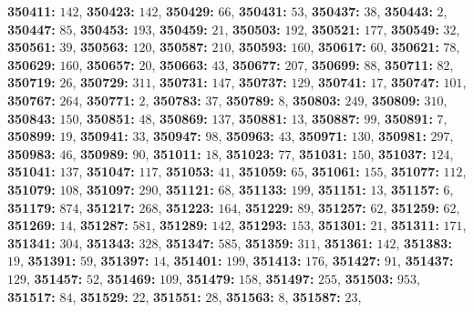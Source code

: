 \textsf{\bfseries 350411:} $142$, \textsf{\bfseries 350423:} $142$, \textsf{\bfseries 350429:} $66$, \textsf{\bfseries 350431:} $53$, \textsf{\bfseries 350437:} $38$, \textsf{\bfseries 350443:} $2$, \textsf{\bfseries 350447:} $85$, \textsf{\bfseries 350453:} $193$, \textsf{\bfseries 350459:} $21$, \textsf{\bfseries 350503:} $192$, \textsf{\bfseries 350521:} $177$, \textsf{\bfseries 350549:} $32$, \textsf{\bfseries 350561:} $39$, \textsf{\bfseries 350563:} $120$, \textsf{\bfseries 350587:} $210$, \textsf{\bfseries 350593:} $160$, \textsf{\bfseries 350617:} $60$, \textsf{\bfseries 350621:} $78$, \textsf{\bfseries 350629:} $160$, \textsf{\bfseries 350657:} $20$, \textsf{\bfseries 350663:} $43$, \textsf{\bfseries 350677:} $207$, \textsf{\bfseries 350699:} $88$, \textsf{\bfseries 350711:} $82$, \textsf{\bfseries 350719:} $26$, \textsf{\bfseries 350729:} $311$, \textsf{\bfseries 350731:} $147$, \textsf{\bfseries 350737:} $129$, \textsf{\bfseries 350741:} $17$, \textsf{\bfseries 350747:} $101$, \textsf{\bfseries 350767:} $264$, \textsf{\bfseries 350771:} $2$, \textsf{\bfseries 350783:} $37$, \textsf{\bfseries 350789:} $8$, \textsf{\bfseries 350803:} $249$, \textsf{\bfseries 350809:} $310$, \textsf{\bfseries 350843:} $150$, \textsf{\bfseries 350851:} $48$, \textsf{\bfseries 350869:} $137$, \textsf{\bfseries 350881:} $13$, \textsf{\bfseries 350887:} $99$, \textsf{\bfseries 350891:} $7$, \textsf{\bfseries 350899:} $19$, \textsf{\bfseries 350941:} $33$, \textsf{\bfseries 350947:} $98$, \textsf{\bfseries 350963:} $43$, \textsf{\bfseries 350971:} $130$, \textsf{\bfseries 350981:} $297$, \textsf{\bfseries 350983:} $46$, \textsf{\bfseries 350989:} $90$, \textsf{\bfseries 351011:} $18$, \textsf{\bfseries 351023:} $77$, \textsf{\bfseries 351031:} $150$, \textsf{\bfseries 351037:} $124$, \textsf{\bfseries 351041:} $137$, \textsf{\bfseries 351047:} $117$, \textsf{\bfseries 351053:} $41$, \textsf{\bfseries 351059:} $65$, \textsf{\bfseries 351061:} $155$, \textsf{\bfseries 351077:} $112$, \textsf{\bfseries 351079:} $108$, \textsf{\bfseries 351097:} $290$, \textsf{\bfseries 351121:} $68$, \textsf{\bfseries 351133:} $199$, \textsf{\bfseries 351151:} $13$, \textsf{\bfseries 351157:} $6$, \textsf{\bfseries 351179:} $874$, \textsf{\bfseries 351217:} $268$, \textsf{\bfseries 351223:} $164$, \textsf{\bfseries 351229:} $89$, \textsf{\bfseries 351257:} $62$, \textsf{\bfseries 351259:} $62$, \textsf{\bfseries 351269:} $14$, \textsf{\bfseries 351287:} $581$, \textsf{\bfseries 351289:} $142$, \textsf{\bfseries 351293:} $153$, \textsf{\bfseries 351301:} $21$, \textsf{\bfseries 351311:} $171$, \textsf{\bfseries 351341:} $304$, \textsf{\bfseries 351343:} $328$, \textsf{\bfseries 351347:} $585$, \textsf{\bfseries 351359:} $311$, \textsf{\bfseries 351361:} $142$, \textsf{\bfseries 351383:} $19$, \textsf{\bfseries 351391:} $59$, \textsf{\bfseries 351397:} $14$, \textsf{\bfseries 351401:} $199$, \textsf{\bfseries 351413:} $176$, \textsf{\bfseries 351427:} $91$, \textsf{\bfseries 351437:} $129$, \textsf{\bfseries 351457:} $52$, \textsf{\bfseries 351469:} $109$, \textsf{\bfseries 351479:} $158$, \textsf{\bfseries 351497:} $255$, \textsf{\bfseries 351503:} $953$, \textsf{\bfseries 351517:} $84$, \textsf{\bfseries 351529:} $22$, \textsf{\bfseries 351551:} $28$, \textsf{\bfseries 351563:} $8$, \textsf{\bfseries 351587:} $23$, 
